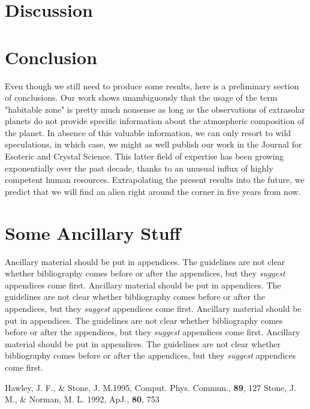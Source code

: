 \documentclass[10pt]{ucscthesisbs}
\begin{document}
\chapter{Discussion}

\chapter{Conclusion}
Even though we still need to produce some results, here is a preliminary section of conclusions.
Our work shows unambiguously that the usage of the term "habitable zone" is pretty much nonsense as long as the observations of extrasolar planets do not provide specific information about the atmospheric composition of the planet. In absence of this valuable information, we can only resort to wild speculations, in which case, we might as well publish our work in the Journal for Esoteric and Crystal Science. This latter field of expertise has been growing exponentially over the past decade, thanks to an unusual influx of highly competent human resources. Extrapolating the
present results into the future, we predict that we will find an alien right around the corner in five years from now.

\appendix
\chapter{Some Ancillary Stuff}

Ancillary material should be put in appendices.  The guidelines are not
clear whether bibliography comes before or after the appendices, but they
\emph{suggest} appendices come first.
Ancillary material should be put in appendices.  The guidelines are not
clear whether bibliography comes before or after the appendices, but they
\emph{suggest} appendices come first.
Ancillary material should be put in appendices.  The guidelines are not
clear whether bibliography comes before or after the appendices, but they
\emph{suggest} appendices come first.
Ancillary material should be put in appendices.  The guidelines are not
clear whether bibliography comes before or after the appendices, but they
\emph{suggest} appendices come first.

\nocite{*}

\begin{thebibliography}{999}
 Hawley, J. F., \& Stone, J. M.1995, Comput. Phys. Commun., {\bf 89}, 127
 Stone, J. M., \& Norman, M. L. 1992, ApJ., {\bf 80}, 753

\end{thebibliography}
\end{document}
